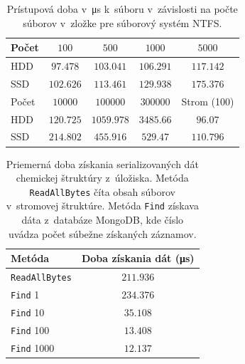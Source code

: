 \documentclass[slovak]{ExcelAtFIT} %
\begin{document}
\begin{table}[h]
	\vskip6pt
	\caption{Prístupová doba v~\si{\micro\second} k~súboru v~závislosti na počte súborov v~zložke pre súborový systém NTFS.}
	\centering
	\begin{tabular}{l|c|c|c|c}
		\toprule
		Počet & $100$ & $500$ & $1000$ & $5000$ \\
		\midrule
		HDD & $97.478$ & $103.041$ & $106.291$ & $117.142$ \\
		SSD & $102.626$ & $113.461$ & $129.938$ & $175.376$ \\
		\midrule[2px]
		Počet & $10000$ & $100000$ & $300000$ & Strom (100)\\
		\midrule
		HDD & $120.725$ & $1059.978$ & $3485.66$ & $96.07$
		 \\
		SSD & $214.802$ & $455.916$ & $529.47$ & $110.796$ \\
		\bottomrule
	\end{tabular}
	\label{tab:disk_access}
\end{table}

\begin{table}[h]
	\vskip6pt
	\caption{Priemerná doba získania serializovaných dát che\-mic\-kej štruktúry z~úložiska. Metóda \texttt{ReadAllBytes} číta obsah súborov v~stromovej štru\-ktú\-re. Metóda \texttt{Find} získava dáta z~databáze MongoDB, kde číslo uvádza počet súbežne zí\-ska\-ný\-ch záznamov. }
	\centering
	\begin{tabular}{l|c}
		\toprule
		Metóda & Doba získania dát (\si{\micro\second})  \\
		\midrule
		\texttt{ReadAllBytes} & $211.936$ \\
		\texttt{Find} 1       & $234.376$ \\
		\texttt{Find} 10      & $35.108$ \\
		\texttt{Find} 100     & $13.408$ \\
		\texttt{Find} 1000    & $12.137$ \\
		\bottomrule
	\end{tabular}
	\label{tab:storage_benchmark}
\end{table}
\end{document}
